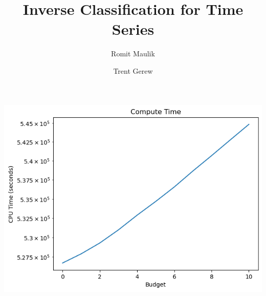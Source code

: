 \documentclass{article}
\begin{document}
	\title{Inverse Classification for Time Series}
	\author{Romit Maulik \and Trent Gerew}

	\maketitle

	\includegraphics[width=\linewidth]{compute_time.png}
\end{document}
